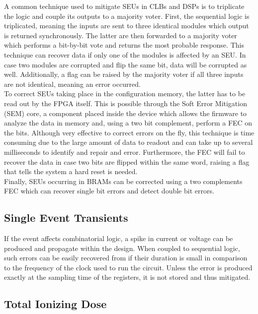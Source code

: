       A common technique used to mitigate SEUs in CLBs and DSPs is to triplicate the logic and couple its outputs to a majority voter. First, the sequential logic is triplicated, meaning the inputs are sent to three identical modules which output is returned synchronously. The latter are then forwarded to a majority voter which performs a bit-by-bit vote and returns the most probable response. This technique can recover data if only one of the modules is affected by an SEU. In case two modules are corrupted and flip the same bit, data will be corrupted as well. Additionally, a flag can be raised by the majority voter if all three inputs are not identical, meaning an error occurred. \\

      To correct SEUs taking place in the configuration memory, the latter has to be read out by the FPGA itself. This is possible through the Soft Error Mitigation (SEM) core, a component placed inside the device which allows the firmware to analyze the data in memory and, using a two bit complement, perform a FEC on the bits. Although very effective to correct errors on the fly, this technique is time consuming due to the large amount of data to readout and can take up to several milliseconds to identify and repair and error. Furthermore, the FEC will fail to recover the data in case two bits are flipped within the same word, raising a flag that tells the system a hard reset is needed. \\

      Finally, SEUs occurring in BRAMs can be corrected using a two complements FEC which can recover single bit errors and detect double bit errors.

    \subsection{Single Event Transients}

      If the event affects combinatorial logic, a spike in current or voltage can be produced and propagate within the design. When coupled to sequential logic, such errors can be easily recovered from if their duration is small in comparison to the frequency of the clock used to run the circuit. Unless the error is produced exactly at the sampling time of the registers, it is not stored and thus mitigated.

    \subsection{Total Ionizing Dose}

